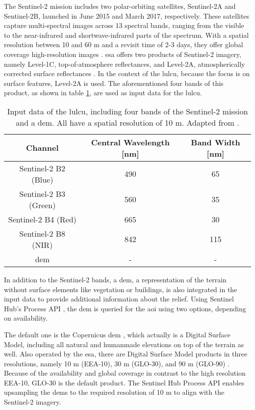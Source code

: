 The Sentinel-2 mission includes two polar-orbiting satellites, Sentinel-2A and Sentinel-2B, launched in June 2015 and March 2017, respectively. These satellites capture multi-spectral images across 13 spectral bands, ranging from the visible to the near-infrared and shortwave-infrared parts of the spectrum. With a spatial resolution between 10 and 60 m and a revisit time of 2-3 days, they offer global coverage high-resolution images \autocite{Basheer.Wang.ea2022,ESA2024,Ludwig.Hecht.ea2021}. \gls{esa} offers two products of Sentinel-2 imagery, namely Level-1C, top-of-atmosphere reflectances, and Level-2A, atmospherically corrected surface reflectances \autocite{ESA2024}. In the context of the \gls{lulcu}, because the focus is on surface features, Level-2A is used. The aforementioned four bands of this product, as shown in table \ref{tab:input_data}, are used as input data for the \gls{lulcu}.

\begin{table}[htb]
    \centering
    \caption[Input Data for the Model]{Input data of the \gls{lulcu}, including four bands of the Sentinel-2 mission and a \gls{dem}. All have a spatial resolution of 10 m. Adapted from \textcite{ESA2024}.}
    \begin{tabular}{ccc}
        \toprule
        \textbf{Channel} & \textbf{Central Wavelength [nm]} & \textbf{Band Width [nm]} \\
        \midrule
        Sentinel-2 B2 (Blue) & 490 & 65 \\
        Sentinel-2 B3 (Green) & 560 & 35 \\
        Sentinel-2 B4 (Red) & 665 & 30 \\
        Sentinel-2 B8 (NIR) & 842 & 115 \\
        \gls{dem} & - & - \\
        \bottomrule
    \end{tabular}
    \label{tab:input_data}
\end{table}

In addition to the Sentinel-2 bands, a \gls{dem}, a representation of the terrain without surface elements like vegetation or buildings, is also integrated in the input data to provide additional information about the relief. Using Sentinel Hub's Process API \autocite{SentinelHub2024}, the \gls{dem} is queried for the \gls{aoi} using two options, depending on availability.

The default one is the Copernicus \gls{dem} \autocite{Airbus2022}, which actually is a Digital Surface Model, including all natural and humanmade elevations on top of the terrain as well. Also operated by the \gls{esa}, there are Digital Surface Model products in three resolutions, namely 10 m (EEA-10), 30 m (GLO-30), and 90 m (GLO-90) \autocite{Airbus2022}. Because of the availability and global coverage in contrast to the high resolution EEA-10, GLO-30 is the default product. The Sentinel Hub Process API enables upsampling the \glspl{dem} to the required resolution of 10 m to align with the Sentinel-2 imagery. 

